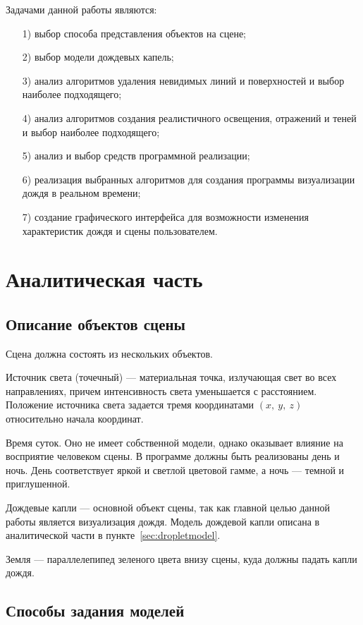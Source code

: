 Задачами данной работы являются:
\begin{enumerate}
\item[1)]
выбор способа представления объектов на сцене;
\item[2)]
выбор модели дождевых капель;
\item[3)]
анализ алгоритмов удаления невидимых линий и поверхностей и выбор наиболее подходящего;
\item[4)]
анализ алгоритмов создания реалистичного освещения, отражений и теней и выбор наиболее подходящего;
\item[5)]
анализ и выбор средств программной реализации;
\item[6)]
реализация выбранных алгоритмов для создания программы визуализации дождя в реальном времени;
\item[7)]
создание графического интерфейса для возможности изменения характеристик дождя и сцены пользователем.
\end{enumerate}

\chapter{Аналитическая часть}

\section{Описание объектов сцены}

Сцена должна состоять из нескольких объектов.

Источник света (точечный) --- материальная точка, излучающая свет во всех направлениях, причем интенсивность света уменьшается с расстоянием. 
Положение источника света задается тремя координатами $(x,~y,~z)$ относительно начала координат.

Время суток. 
Оно не имеет собственной модели, однако оказывает влияние на восприятие человеком сцены. 
В программе должны быть реализованы день и ночь. 
День соответствует яркой и светлой цветовой гамме, а ночь --- темной и приглушенной.

Дождевые капли --- основной объект сцены, так как главной целью данной работы является визуализация дождя. 
Модель дождевой капли описана в аналитической части в пункте~\ref{sec:dropletmodel}.

Земля --- параллелепипед зеленого цвета внизу сцены, куда должны падать капли дождя. 

\section{Способы задания моделей}

